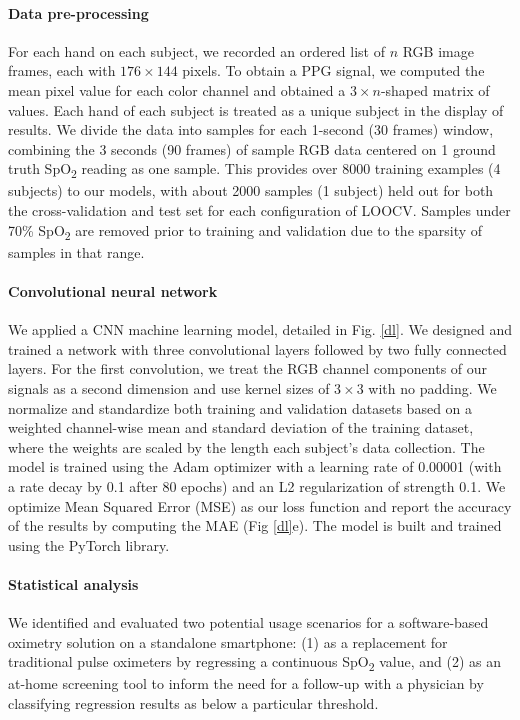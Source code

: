 \documentclass[12pt]{article}
\begin{document}
\paragraph*{Data pre-processing}
For each hand on each subject, we recorded an ordered list of $n$ RGB image frames, each with $176\times144$ pixels. To obtain a PPG signal, we computed the mean pixel value for each color channel and obtained a $3\times n$-shaped matrix of values. 
Each hand of each subject is treated as a unique subject in the display of results. 
We divide the data into samples for each 1-second (30 frames) window, combining the 3 seconds (90 frames) of sample RGB data centered on 1 ground truth SpO\textsubscript{2} reading as one sample. This provides over 8000 training examples (4 subjects) to our models, with about 2000 samples (1 subject) held out for both the cross-validation and test set for each configuration of LOOCV. Samples under 70\% SpO\textsubscript{2} are removed prior to training and validation due to the sparsity of samples in that range.

\paragraph*{Convolutional neural network}
We applied a CNN machine learning model, detailed in Fig. \ref{dl}. 
We designed and trained a network with three convolutional layers 
followed by two fully connected layers.
For the first convolution, we treat the RGB channel components of our signals as a second dimension and use kernel sizes of $3\times3$ with no padding. We normalize and standardize both training and validation datasets based on a weighted channel-wise mean and standard deviation of the training dataset, where the weights are scaled by the length each subject's data collection. 
The model is trained using the Adam optimizer with a learning rate of 0.00001 (with a rate decay by 0.1 after 80 epochs) and an L2 regularization of strength 0.1. We optimize Mean Squared Error (MSE) as our loss function and report the accuracy of the results by computing the MAE (Fig \ref{dl}e). The model is built and trained using the PyTorch library.

\paragraph*{Statistical analysis}
We identified and evaluated two potential usage scenarios for a software-based oximetry solution on a standalone smartphone: (1) as a replacement for traditional pulse oximeters by regressing a continuous SpO\textsubscript{2} value, and (2) as an at-home screening tool to inform the need for a follow-up with a physician by classifying regression results as below a particular threshold. 
\end{document}
